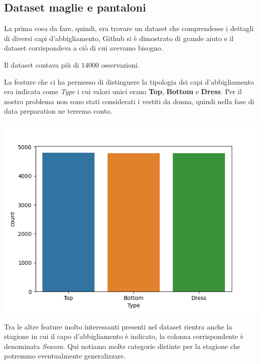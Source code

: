 \documentclass[a4paper, 11pt, oneside]{report}
\begin{document}
                \subsection{Dataset maglie e pantaloni}
                La prima cosa da fare, quindi, era trovare un dataset che comprendesse i dettagli di diversi capi d'abbigliamento,
                Github si è dimostrato di grande aiuto e il dataset \cite{6} corrispondeva a ciò di cui avevamo bisogno.
                \\
                \par \noindent Il dataset contava più di $14000$ osservazioni.
                \\
                \par \noindent La feature che ci ha permesso di distinguere la tipologia dei capi d'abbigliamento
                era indicata come \textit{Type} i cui valori unici erano \textbf{Top}, \textbf{Bottom} e \textbf{Dress}.
                Per il nostro problema non sono stati considerati i vestiti da donna, quindi nella fase di data preparation
                ne terremo conto.
                \begin{center}
                    \includegraphics[scale=0.4]{countTopBottom}
                \end{center}
                \bigskip
                \par \noindent Tra le altre feature molto interessanti presenti nel dataset rientra anche la stagione
                in cui il capo d'abbigliamento è indicato, la colonna corrispondente è denominata \textit{Season}.
                Qui notiamo molte categorie distinte per la stagione che potremmo eventualmente generalizzare.
\end{document}
